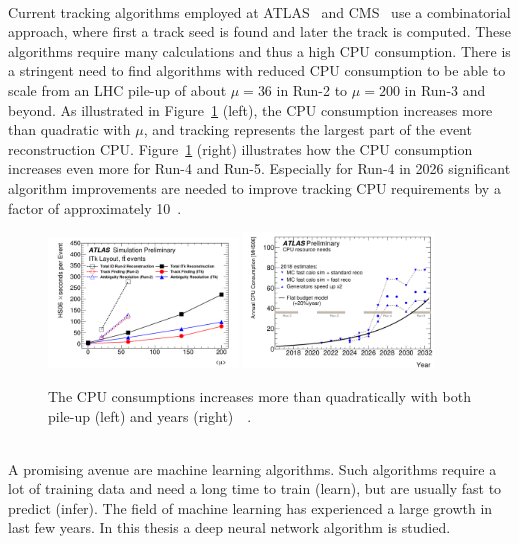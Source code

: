 \ \\ Current tracking algorithms employed at ATLAS~\cite{TrackingATLAS} and CMS~\cite{TrackingCMS} use a combinatorial approach, where first a track seed is found and later the track is computed. These algorithms require many calculations and thus a high CPU consumption. There is a stringent need to find algorithms with reduced CPU consumption to be able to scale from an LHC pile-up of about $\mu=36$ in Run-2 to $\mu=200$ in Run-3 and beyond. As illustrated in Figure~\ref{fig:CPU} (left), the CPU consumption increases more than quadratic with $\mu$, and tracking represents the largest part of the event reconstruction CPU. Figure~\ref{fig:CPU} (right) illustrates how the CPU consumption increases even more for Run-4 and Run-5. Especially for Run-4 in 2026 significant algorithm improvements are needed to improve tracking CPU requirements by a factor of approximately 10~\cite{TrackMLPPTBefore}.


\begin{figure}[htb]
\centering
\includegraphics[width=0.45\textwidth]{./plots/CPU1.png}
\includegraphics[width=0.45\textwidth]{./plots/CPU2.png}
\caption{The CPU consumptions increases more than quadratically with both pile-up (left) and years (right)~\cite{TrackMLPPTAfter}~\cite{TrackMLPPTAfter2}.}
\label{fig:CPU}
\end{figure}

\ \\A promising avenue are machine learning algorithms. Such algorithms require a lot of training data and need a long time to train (learn), but are usually fast to predict (infer). The field of machine learning has experienced a large growth in last few years. In this thesis a deep neural network algorithm is studied.
